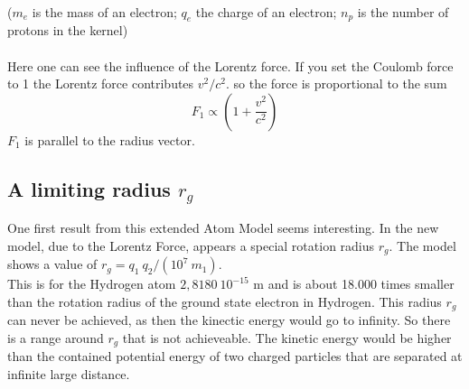 \documentclass[10pt,titlepage]{article}
\begin{document}
\\($m_e$ is the mass of an electron; $q_e$ the charge of an electron; $n_p$ is the number of protons in the kernel)
\\\\
Here one can see the influence of the Lorentz force. If you set the Coulomb force to 1 the Lorentz force contributes $v^2/c^2$.
so the force is proportional to the sum
\begin{equation}
\textbf{${F}_1$} \propto (1+\frac{v^2}{c^2})
\end{equation}
$F_1$ is parallel to the radius vector.

\subsection{A limiting radius $r_g$}
One first result from this extended Atom Model seems interesting. In the new model, due to the Lorentz Force, appears a special rotation radius $r_g$. The model shows a value of  $r_g=q_1 \ q_2/(10^7 \ m_1)$. \\This is for the Hydrogen atom $2,8180 \ 10^{-15}$ m and is about 18.000 times smaller than the rotation radius of the ground state electron in Hydrogen. This radius $r_g$ can never be achieved, as then the kinectic energy would go to infinity. So there is a range around $r_g$ that is not achieveable. The kinetic energy would be higher than the contained potential energy of two charged particles that are separated at infinite large distance.
\\\\

\end{document}
